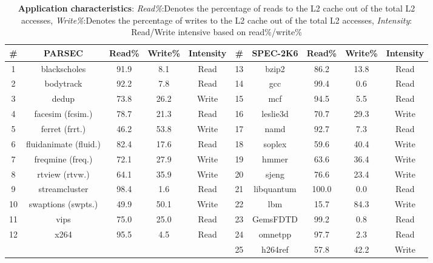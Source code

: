 \begin {table}[t]
 \centering
  \singlespacing
 \caption{{\bf Application characteristics}: {\it Read\%}:Denotes the percentage of reads to the L2 cache out of the total L2 accesses,
 {\it Write\%}:Denotes the percentage of writes to the L2 cache out of the total L2 accesses, {\it Intensity}: Read/Write intensive based on read\%/write\%}
 \label{table:benchmark}
 \scriptsize
\begin{tabular}{||c|c|c|c|c||c|c|c|c|c||}
\hline
\# & PARSEC & Read\% & Write\% & Intensity & \# & SPEC-2K6 & Read\% & Write\% & Intensity \\
\hline \hline
1 & blackscholes  &  91.9 &  8.1 &   Read &  13 &  bzip2 & 86.2 & 13.8 & Read \\
\hline
2 &     bodytrack  &     92.2 &  7.8 &   Read &  14 & gcc &  99.4 &  0.6 & Read \\
\hline
3 &     dedup  & 73.8 &  26.2 &  Write & 15 &    mcf & 94.5 &  5.5 & Read \\
\hline
4 &     facesim (fcsim.) & 78.7 &  21.3 &  Read &  16 & leslie3d & 70.7 & 29.3 & Write \\
\hline
5 &     ferret (frrt.) & 46.2 &  53.8 &  Write & 17 & namd &  92.7 &  7.3 & Read \\
\hline
6 &     fluidanimate (fluid.) &  82.4 &  17.6 &  Read &  18 & soplex & 59.6 & 40.4 & Write \\
\hline
7 &     freqmine (freq.) & 72.1 & 27.9 & Write & 19 & hmmer &   63.6 &  36.4 &  Write \\
\hline
8 &     rtview (rtvw.) & 64.1 & 35.9 &  Write & 20 & sjeng & 76.6 &  23.4 &  Write \\
\hline
9 &     streamcluster & 98.4 &  1.6 &   Read &  21 & libquantum & 100.0 & 0.0 & Read \\
\hline
10 &    swaptions (swpts.) & 49.9 & 50.1 & Write & 22 & lbm & 15.7 & 84.3 & Write \\
\hline
11 &    vips &  75.0 &  25.0 &  Read &  23 & GemsFDTD & 99.2 & 0.8 & Read \\
\hline
12 &    x264 &  95.5 &  4.5 & Read &  24 & omnetpp & 97.7 & 2.3 & Read \\
\hline
& & & & & 25 &  h264ref & 57.8 &  42.2 &  Write \\
\hline \hline
\end{tabular}
\end{table}



